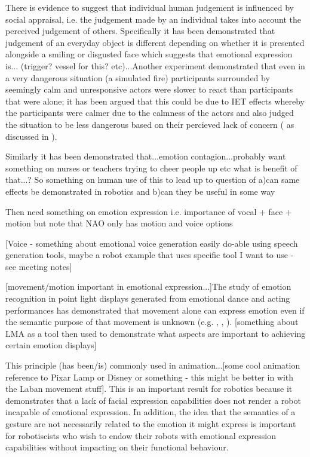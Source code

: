 \documentclass[11pt]{article}
\begin{document}
There is evidence to suggest that individual human judgement is influenced by social appraisal, i.e. the judgement made by an individual takes into account the perceived judgement of others. Specifically it has been demonstrated that judgement of an everyday object is different depending on whether it is presented alongside a smiling or disgusted face \cite{bayliss2007affective} which suggests that emotional expression is... (trigger? vessel for this? etc)...Another experiment demonstrated that even in a very dangerous situation (a simulated fire) participants surrounded by seemingly calm and unresponsive actors were slower to react than participants that were alone; it has been argued that this could be due to IET effects whereby the participants were calmer due to the calmness of the actors and also judged the situation to be less dangerous based on their percieved lack of concern (\cite{latane1968group} as discussed in \cite{parkinson2011interpersonal}).

Similarly it has been demonstrated that...emotion contagion...probably want something on nurses or teachers trying to cheer people up etc what is benefit of that...? So something on human use of this to lead up to question of a)can same effects be demonstrated in robotics and b)can they be useful in some way

Then need something on emotion expression i.e. importance of vocal + face + motion but note that NAO only has motion and voice options

[Voice - something about emotional voice generation easily do-able using speech generation tools, maybe a robot example that uses specific tool I want to use - see meeting notes]

[movement/motion important in emotional expression...]The study of emotion recognition in point light displays generated from emotional dance and acting performances has demonstrated that movement alone can express emotion even if the semantic purpose of that movement is unknown (e.g. \cite{dittrich1996perception}, \cite{pollick2001perceiving}, \cite{atkinson2004emotion}). [something about LMA as a tool then used to demonstrate what aspects are important to achieving certain emotion displays]

This principle (has been/is) commonly used in animation...[some cool animation reference to Pixar Lamp or Disney or something - this might be better in with the Laban movement stuff]. This is an important result for robotics because it demonstrates that a lack of facial expression capabilities does not render a robot incapable of emotional expression. In addition, the idea that the semantics of a gesture are not necessarily related to the emotion it might express is important for robotiscists who wish to endow their robots with emotional expression capabilities without impacting on their functional behaviour. 
\end{document}
